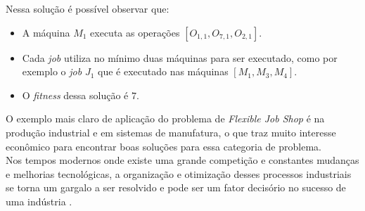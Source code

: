 \noindent Nessa solução é possível observar que:
\begin{itemize}
    \item A máquina $M_1$ executa as operações $[O_{1,1}, O_{7,1}, O_{2,1}]$.
    \item Cada \textit{job} utiliza no mínimo duas máquinas para ser executado, como por exemplo o \textit{job} $J_1$ que é executado nas máquinas $[M_1 , M_3, M_4]$.
    \item O \textit{fitness} dessa solução é $7$.
\end{itemize}
\indent O exemplo mais claro de aplicação do problema de \textit{Flexible Job Shop} é na produção industrial e em sistemas de manufatura, o que traz muito interesse econômico para encontrar boas soluções para essa categoria de problema.\\
%
\indent Nos tempos modernos onde existe uma grande competição e constantes mudanças e melhorias tecnológicas, a organização e otimização desses processos industriais se torna um gargalo a ser resolvido e pode ser um fator decisório no sucesso de uma indústria \cite{Wari2016}.
